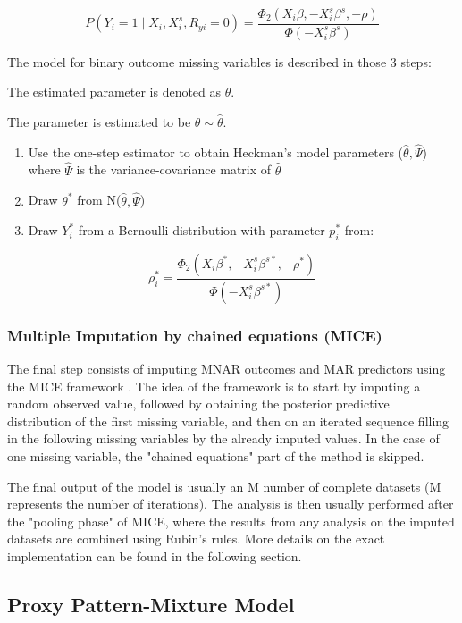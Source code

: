 \documentclass[11pt,a4paper]{article}
\begin{document}
$$
P\left(Y_i=1 \mid X_i, X_i^s, R_{y i}=0\right)=\frac{\Phi_2\left(X_i \beta,-X_i^s \beta^s,-\rho\right)}{\Phi\left(-X_i^s \beta^s\right)}
$$


The model for binary outcome missing variables is described in those 3 steps:

The estimated parameter is denoted as $\hat{\theta}$.

The parameter is estimated to be $\theta \sim \hat{\theta}$.

\begin{enumerate}
  \item Use the one-step estimator to obtain Heckman's model parameters ($\hat{\theta},\hat{\Psi}$) where $\hat{\Psi}$ is the variance-covariance matrix of $\hat{\theta}$
  \item Draw $\theta^{*}$ from N($\hat{\theta},\hat{\Psi}$)
  \item Draw $Y_i^*$ from a Bernoulli distribution with parameter $p_i^*$ from:  
\end{enumerate}

$$\rho_i^* = \frac{\Phi_2\left(X_i \beta^*,-X_i^s \beta^{s*},-\rho^*\right)}{\Phi\left(-X_i^s \beta^{s*}\right)}$$



\subsubsection{Multiple Imputation by chained equations (MICE)}

The final step consists of imputing MNAR outcomes and MAR predictors using the MICE framework \cite{van_buuren_multiple_2007}. The idea of the framework is to start by imputing a random observed value, followed by obtaining the posterior predictive distribution of the first missing variable, and then on an iterated sequence filling in the following missing variables by the already imputed values. In the case of one missing variable, the "chained equations" part of the method is skipped. 

The final output of the model is usually an M number of complete datasets (M represents the number of iterations). The analysis is then usually performed after the "pooling phase" of MICE, where the results from any analysis on the imputed datasets are combined using Rubin's rules.
More details on the exact implementation can be found in the following section.


\subsection{Proxy Pattern-Mixture Model}
\end{document}
